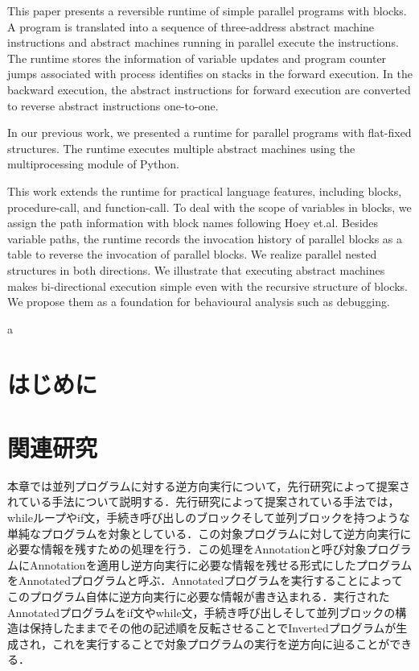\documentclass[submit,PRO]{ipsj}
\begin{document}
\begin{eabstract}
This paper presents a reversible runtime of simple parallel programs
with blocks.  A program is translated into a sequence of three-address
abstract machine instructions and abstract machines running in
parallel execute the instructions.  The runtime stores the information
of variable updates and program counter jumps associated with process
identifies on stacks in the forward execution. In the backward
execution, the abstract instructions for forward execution are
converted to reverse abstract instructions one-to-one.

In our previous work, we presented a runtime for parallel programs with
flat-fixed structures.  The runtime executes multiple abstract
machines using the multiprocessing module of Python.

This work extends the runtime for practical language features,
including blocks, procedure-call, and function-call. To deal with the
scope of variables in blocks, we assign the path information with
block names following Hoey et.al.  Besides variable paths, the runtime
records the invocation history of parallel blocks as a table to
reverse the invocation of parallel blocks.  We realize parallel nested
structures in both directions.  We illustrate that executing abstract
machines makes bi-directional execution simple even with the recursive
structure of blocks.  We propose them as a foundation for behavioural
analysis such as debugging.

\end{eabstract}

\begin{ekeyword}
a
\end{ekeyword}

\maketitle

\section{はじめに}





\section{関連研究}

本章では並列プログラムに対する逆方向実行について，先行研究によって提案されている手法について説明する．先行研究によって提案されている手法では，whileループやif文，手続き呼び出しのブロックそして並列ブロックを持つような単純なプログラムを対象としている．この対象プログラムに対して逆方向実行に必要な情報を残すための処理を行う．この処理をAnnotationと呼び対象プログラムにAnnotationを適用し逆方向実行に必要な情報を残せる形式にしたプログラムをAnnotatedプログラムと呼ぶ．Annotatedプログラムを実行することによってこのプログラム自体に逆方向実行に必要な情報が書き込まれる．実行されたAnnotatedプログラムをif文やwhile文，手続き呼び出しそして並列ブロックの構造は保持したままでその他の記述順を反転させることでInvertedプログラムが生成され，これを実行することで対象プログラムの実行を逆方向に辿ることができる．
\end{document}

